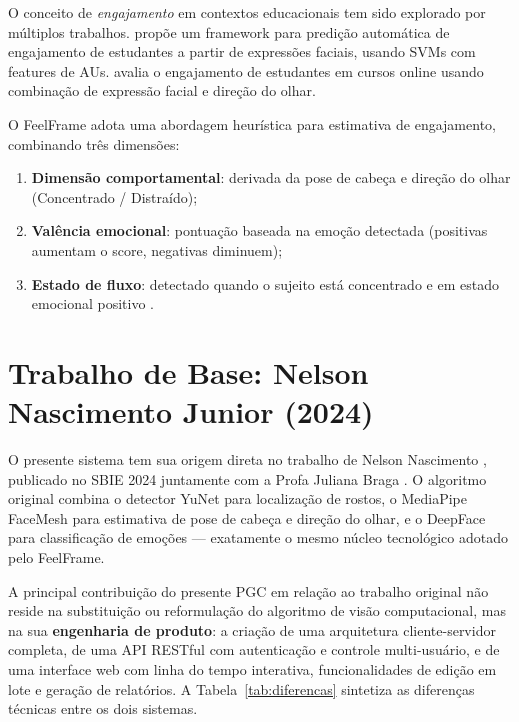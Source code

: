 \documentclass[
	12pt,
	openright,
	oneside,
	a4paper,
	english,
	brazil
	]{abntex2}
\begin{document}
O conceito de \textit{engajamento} em contextos educacionais tem sido explorado por múltiplos trabalhos. \cite{whitehill2014faces} propõe um framework para predição automática de engajamento de estudantes a partir de expressões faciais, usando SVMs com features de AUs. \cite{kaur2018prediction} avalia o engajamento de estudantes em cursos online usando combinação de expressão facial e direção do olhar.

O FeelFrame adota uma abordagem heurística para estimativa de engajamento, combinando três dimensões:
\begin{enumerate}
    \item \textbf{Dimensão comportamental}: derivada da pose de cabeça e direção do olhar (Concentrado / Distraído);
    \item \textbf{Valência emocional}: pontuação baseada na emoção detectada (positivas aumentam o score, negativas diminuem);
    \item \textbf{Estado de fluxo}: detectado quando o sujeito está concentrado e em estado emocional positivo \cite{csikszentmihalyi1990flow}.
\end{enumerate}

\section{Trabalho de Base: Nelson Nascimento Junior (2024)}
\label{sec:nelson}

O presente sistema tem sua origem direta no trabalho de Nelson Nascimento  \cite{nascimento2024nelson}, publicado no SBIE 2024 juntamente com a Profa Juliana Braga
\cite{nascimento2024sbie}. O algoritmo original combina o detector YuNet para localização de rostos, o MediaPipe FaceMesh para estimativa de pose de cabeça e direção do olhar, e o DeepFace para classificação de emoções --- exatamente o mesmo núcleo tecnológico adotado pelo FeelFrame.

A principal contribuição do presente PGC em relação ao trabalho original não reside na substituição ou reformulação do algoritmo de visão computacional, mas na sua \textbf{engenharia de produto}: a criação de uma arquitetura cliente-servidor completa, de uma API RESTful com autenticação e controle multi-usuário, e de uma interface web com linha do tempo interativa, funcionalidades de edição em lote e geração de relatórios. A Tabela~\ref{tab:diferencas} sintetiza as diferenças técnicas entre os dois sistemas.
\end{document}
